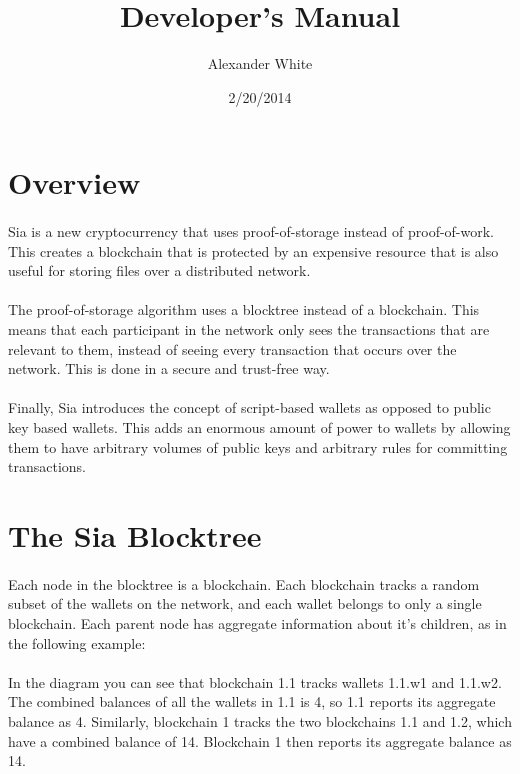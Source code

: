 \documentclass[a4paper,10pt]{article}
\title{Developer's Manual}
\author{Alexander White}
\date{2/20/2014}
\begin{document}
\maketitle
\tableofcontents
\section{Overview}
\paragraph{} \raggedright Sia is a new cryptocurrency that uses 
proof-of-storage instead of proof-of-work. This creates a blockchain that is 
protected by an expensive resource that is also useful for storing files over a 
distributed network.
\paragraph{}The proof-of-storage algorithm uses a blocktree instead of a 
blockchain. This means that each participant in the network only sees the 
transactions that are relevant to them, instead of seeing every transaction 
that occurs over the network. This is done in a secure and trust-free way.
\paragraph{}Finally, Sia introduces the concept of script-based wallets as 
opposed to public key based wallets. This adds an enormous amount of power to 
wallets by allowing them to have arbitrary volumes of public keys and arbitrary 
rules for committing transactions.\linebreak
\section{The Sia Blocktree}
\paragraph{}Each node in the blocktree is a blockchain. Each blockchain tracks 
a random subset of the wallets on the network, and each wallet belongs to only 
a single blockchain. Each parent node has aggregate information about it’s 
children, as in the following example:\linebreak

\paragraph{}
\indent
In the diagram you can see that blockchain 1.1 tracks wallets 1.1.w1 and 
1.1.w2. The combined balances of all the wallets in 1.1 is 4, so 1.1 reports 
its aggregate balance as 4. Similarly, blockchain 1 tracks the two blockchains 
1.1 and 1.2, which have a combined balance of 14. Blockchain 1 then reports its 
aggregate balance as 14.
\end{document}

